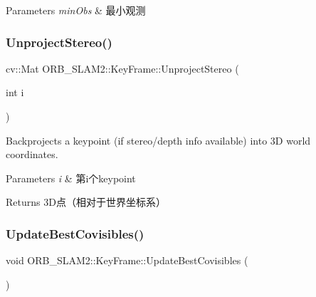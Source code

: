 \begin{DoxyParams}{Parameters}
{\em min\+Obs} & 最小观测 \\
\hline
\end{DoxyParams}
\mbox{\label{class_o_r_b___s_l_a_m2_1_1_key_frame_a0d2dc03ca0d62fc5585773e43d503e79}} 
\subsubsection{\texorpdfstring{Unproject\+Stereo()}{UnprojectStereo()}}
{\footnotesize\ttfamily cv\+::\+Mat O\+R\+B\+\_\+\+S\+L\+A\+M2\+::\+Key\+Frame\+::\+Unproject\+Stereo (\begin{DoxyParamCaption}\item[{int}]{i }\end{DoxyParamCaption})}



Backprojects a keypoint (if stereo/depth info available) into 3D world coordinates. 


\begin{DoxyParams}{Parameters}
{\em i} & 第i个keypoint \\
\hline
\end{DoxyParams}
\begin{DoxyReturn}{Returns}
3\+D点（相对于世界坐标系） 
\end{DoxyReturn}
\mbox{\label{class_o_r_b___s_l_a_m2_1_1_key_frame_a09cb8502509c136536bf8d45793f8872}} 
\subsubsection{\texorpdfstring{Update\+Best\+Covisibles()}{UpdateBestCovisibles()}}
{\footnotesize\ttfamily void O\+R\+B\+\_\+\+S\+L\+A\+M2\+::\+Key\+Frame\+::\+Update\+Best\+Covisibles (\begin{DoxyParamCaption}{ }\end{DoxyParamCaption})}



